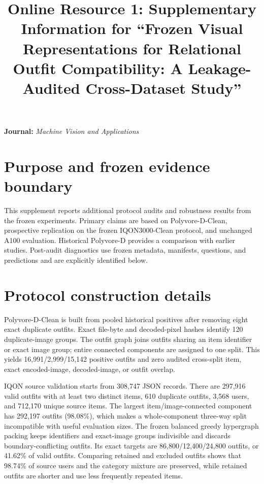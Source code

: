 \documentclass[pdflatex,sn-mathphys-num,iicol]{sn-jnl}
\begin{document}
\title[Supplementary information]{Online Resource 1: Supplementary Information for ``Frozen Visual Representations for Relational Outfit Compatibility: A Leakage-Audited Cross-Dataset Study''}
\author*[1]{ }
\author[1]{ }
\author[1]{ }
\author[1]{ }
\author[1]{ }
\maketitle

\noindent\textbf{Journal:} \emph{Machine Vision and Applications}

\section{Purpose and frozen evidence boundary}

This supplement reports additional protocol audits and robustness results from the frozen experiments. Primary claims are based on Polyvore-D-Clean, prospective replication on the frozen IQON3000-Clean protocol, and unchanged A100 evaluation. Historical Polyvore-D provides a comparison with earlier studies. Post-audit diagnostics use frozen metadata, manifests, questions, and predictions and are explicitly identified below.

\section{Protocol construction details}

Polyvore-D-Clean is built from pooled historical positives after removing eight exact duplicate outfits. Exact file-byte and decoded-pixel hashes identify 120 duplicate-image groups. The outfit graph joins outfits sharing an item identifier or exact image group; entire connected components are assigned to one split. This yields 16,991/2,999/15,142 positive outfits and zero audited cross-split item, exact encoded-image, decoded-image, or outfit overlap.

IQON source validation starts from 308,747 JSON records. There are 297,916 valid outfits with at least two distinct items, 610 duplicate outfits, 3,568 users, and 712,170 unique source items. The largest item/image-connected component has 292,197 outfits (98.08\%), which makes a whole-component three-way split incompatible with useful evaluation sizes. The frozen balanced greedy hypergraph packing keeps identifiers and exact-image groups indivisible and discards boundary-conflicting outfits. Its exact targets are 86,800/12,400/24,800 outfits, or 41.62\% of valid outfits. Comparing retained and excluded outfits shows that 98.74\% of source users and the category mixture are preserved, while retained outfits are shorter and use less frequently repeated items.
\end{document}
